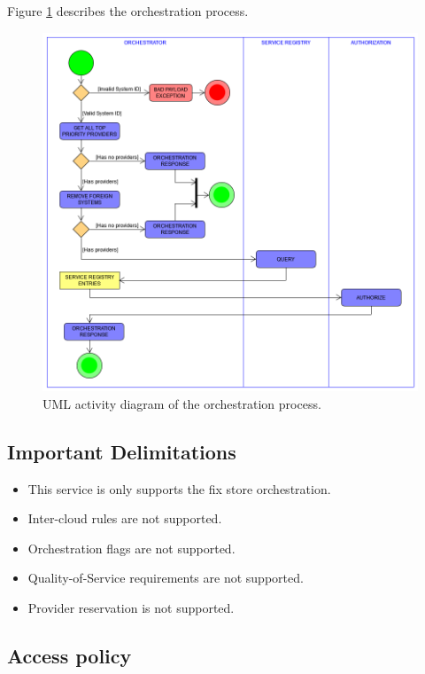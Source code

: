 \documentclass[a4paper]{arrowhead}
\begin{document}
Figure \ref{fig:activity_uml} describes the orchestration process.

\begin{figure}[h!]
  \centering
  \includegraphics[width=16cm]
  {figures/post_store_orchestration_activity_uml}
  \caption{
    UML activity diagram of the orchestration process.
  }
  \label{fig:activity_uml}
\end{figure}

\clearpage

\subsection{Important Delimitations}
\label{sec:delimitations}

\begin{itemize}
    \item This service is only supports the fix store orchestration.
    \item Inter-cloud rules are not supported.
    \item Orchestration flags are not supported.
    \item Quality-of-Service requirements are not supported.
    \item Provider reservation is not supported.
\end{itemize}

\subsection{Access policy}
\label{sec:accesspolicy}
\end{document}
